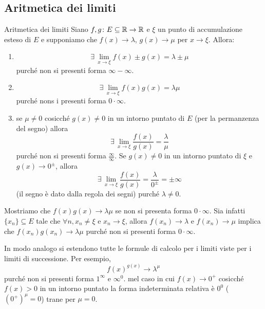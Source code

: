 \documentclass[a4paper]{article}
\begin{document}
\subsection{Aritmetica dei limiti}

\begin{snippetproposition}{Aritmetica dei limiti}
    Siano \(f,g \colon E \subseteq \mathbb{R} \to \mathbb{R}\)
    e \(\xi\) un punto di accumulazione esteso di \(E\)
    e supponiamo che \(f(x) \to \lambda\), \(g(x) \to \mu\) per \(x \to \xi\).
    Allora:
    \begin{enumerate}
        \item \[
            \exists \, \lim_{x\to\xi} f(x) \pm g(x) = \lambda \pm \mu
        \]
        purché non si presenti forma \(\infty - \infty\).
        \item \[
            \exists \, \lim_{x\to\xi} f(x)g(x) = \lambda\mu
        \]
        purché nons i presenti forma \(0\cdot\infty\).
        \item se \(\mu \neq 0\) cosicché \(g(x) \neq 0\) in un intorno puntato di \(E\)
        (per la permanzenza del segno) allora \[
            \exists \, \lim_{x\to\xi} \frac{f(x)}{g(x)} = \frac{\lambda}{\mu}
        \]
        purché non si presenti forma \(\frac{\infty}{\infty}\).
        Se \(g(x) \neq 0\) in un intorno puntato di \(\xi\) e \(g(x) \to 0^\pm\),
        allora
        \[
            \exists \, \lim_{x\to\xi} \frac{f(x)}{g(x)} = \frac{\lambda}{0^\pm} = \pm\infty
        \]
        (il segno è dato dalla regola dei segni) purché \(\lambda \neq 0\).
    \end{enumerate}
\end{snippetproposition}

\begin{snippetproof}{}
    Mostriamo che \(f(x)g(x) \to \lambda\mu\) se non si presenta forma \(0\cdot\infty\).
    Sia infatti \(\{x_n\} \subseteq E\) tale che \(\forall n, x_n \neq \xi\)
    e \(x_n \to \xi\), allora \(f(x_n) \to \lambda\) e \(f(x_n) \to \mu\)
    implica che \(f(x_n)g(x_n) \to \lambda\mu\) purché non si presenti forma \(0\cdot\infty\).
\end{snippetproof}

In modo analogo si estendono tutte le formule di calcolo per i limiti viste per i limiti di successione.
Per esempio, \[
    {f(x)}^{g(x)} \to \lambda^\mu
\]
purché non si presenti forma \(1^\infty\) e \(\infty^0\).
mel caso in cui \(f(x) \to 0^+\) cosicché \(f(x) > 0\)
in un intorno puntato la forma indeterminata
relativa è \(0^0\) (\({(0^+)}^\mu = 0\)) trane per \(\mu=0\).
\end{document}
